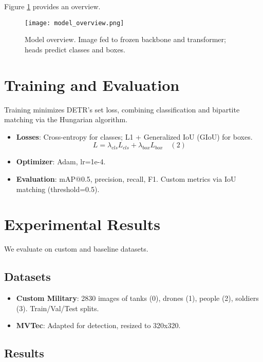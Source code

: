 \documentclass[12pt]{article}
\begin{document}
Figure \ref{fig:model} provides an overview.

\begin{figure}[h]
    \centering
    \texttt{[image: model\_overview.png]}
    \caption{Model overview. Image fed to frozen backbone and transformer; heads predict classes and boxes.}
    \label{fig:model}
\end{figure}

\section{Training and Evaluation}

Training minimizes DETR's set loss, combining classification and bipartite matching via the Hungarian algorithm.

\begin{itemize}
    \item \textbf{Losses}: Cross-entropy for classes; L1 + Generalized IoU (GIoU) for boxes.
    \[
    L = \lambda_{cls} L_{cls} + \lambda_{box} L_{box} \quad (2)
    \]
    \item \textbf{Optimizer}: Adam, lr=1e-4.
    \item \textbf{Evaluation}: mAP@0.5, precision, recall, F1. Custom metrics via IoU matching (threshold=0.5).
\end{itemize}

\section{Experimental Results}

We evaluate on custom and baseline datasets.

\subsection{Datasets}

\begin{itemize}
    \item \textbf{Custom Military}: 2830 images of tanks (0), drones (1), people (2), soldiers (3). Train/Val/Test splits.
    \item \textbf{MVTec}: Adapted for detection, resized to 320x320.
\end{itemize}

\subsection{Results}
\end{document}
